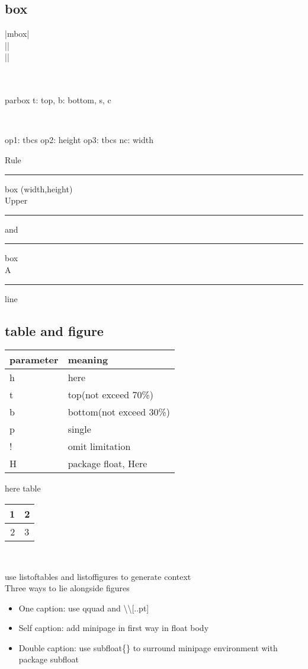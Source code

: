 \documentclass{article}
\begin{document}
\subsection{box}
    |\mbox{mbox}|\\
    ||\\
    ||\\
    \\
    \\
    \setlength{\fboxrule}{1.6pt} 
    \setlength{\fboxsep}{1em}
    \parbox[t]{3em}{parbox t: top, b: bottom, s, c}\\
    \begin{minipage}[b][8ex][t]{4em}
        op1: tbcs
        op2: height
        op3: tbcs
        nc:  width
    \end{minipage}
    Rule \rule{12pt}{4pt} box (width,height)\\
    Upper \rule[4pt]{6pt}{8pt} and \rule[-4pt]{6pt}{8pt} box\\
    A \rule[-.4pt]{3em}{.4pt} line

\subsection{table and figure}
    \begin{table}[h]
        \begin{tabular}{ll}
        \hline
        parameter\footnotemark & meaning\\ \hline
        h & here\\
        t & top(not exceed 70\%)\\
        b & bottom(not exceed 30\%)\\
        p & single\\
        ! & omit limitation\\
        H & package float, Here\\
        \hline
        \end{tabular}
    \end{table}
    here table \begin{table}[H]
        \begin{tabular}{@{}r@{:}l@{}}
        \hline
        1 & 2\\ \hline
        2 & 3\\ \hline
        \end{tabular}\
    \end{table}
    use listoftables and listoffigures to generate context\\
    Three ways to lie alongside figures
    \begin{itemize}
        \item One caption: use qquad and \textbackslash\textbackslash[..pt]
        \item Self caption: add minipage in first way in float body
        \item Double caption: use subfloat\{\} to surround minipage environment with package subfloat
    \end{itemize}
\end{document}
